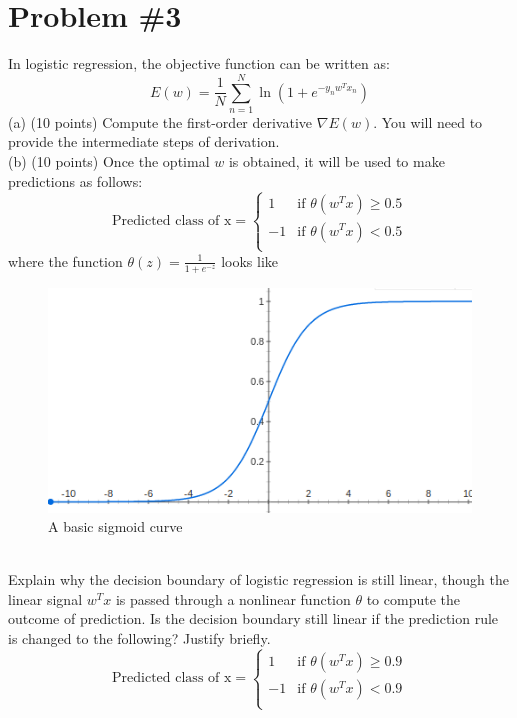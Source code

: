 \documentclass[12pt]{article}
\begin{document}
	\section*{Problem \#3}
	In logistic regression, the objective function can be written as:
	\begin{equation}
	E(w)=\frac{1}{N} \sum_{n=1}^{N} \ln(1+e^{-y_nw^Tx_n})
	\end{equation}
	(a) (10 points) Compute the first-order derivative $\nabla E(w)$. You will need to provide the intermediate steps of derivation.\\
	(b) (10 points) Once the optimal $w$ is obtained, it will be used to make predictions as follows:
	\begin{equation}
	\text{Predicted class of x} = 
	\begin{cases}
	1 & \text{if } \theta(w^Tx) \ge 0.5 \\
	-1 & \text{if } \theta(w^Tx) < 0.5 \\
	\end{cases}
	\end{equation}
	where the function $\theta(z) = \frac{1}{1+e^{-z}}$ looks like \\
	\begin{figure}[h]
		\includegraphics[width=\linewidth]{sigmoid.png}
		\caption{A basic sigmoid curve}
		\label{fig:sigmoidEx}
	\end{figure}
	\\ Explain why the decision boundary of logistic regression is still linear, though the linear signal $w^Tx$ is passed through a nonlinear function $\theta$ to compute the outcome of prediction.
	Is the decision boundary still linear if the prediction rule is changed to the following? Justify briefly.
	\begin{equation}
	\text{Predicted class of x} = 
	\begin{cases}
	1 & \text{if } \theta(w^Tx) \ge 0.9 \\
	-1 & \text{if } \theta(w^Tx) < 0.9 \\
	\end{cases}
	\end{equation}
	
\end{document}
